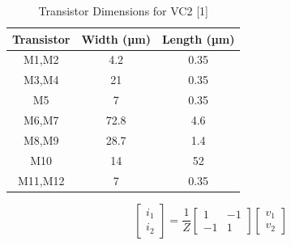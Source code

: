 \documentclass{./styles/svproc}
\begin{document}
\begin{table}[h]
\centering
\caption{Transistor Dimensions for VC2 [1]}
\begin{tabular}{|c|c|c|}
\hline
Transistor & Width (µm) & Length (µm) \\
\hline
M1,M2 & 4.2 & 0.35 \\
M3,M4 & 21 & 0.35 \\
M5 & 7 & 0.35 \\
M6,M7 & 72.8 & 4.6 \\
M8,M9 & 28.7 & 1.4 \\
M10 & 14 & 52 \\
M11,M12 & 7 & 0.35 \\
\hline
\end{tabular}
\end{table}
\vspace{0.5cm}

\begin{equation}\label{assumption_matrix}
\hspace{0cm}
\begin{bmatrix}
i_1\\
i_2 
\end{bmatrix} =\frac{1}{Z} \begin{bmatrix}
1&-1\\
-1&1
\end{bmatrix} \begin{bmatrix}
v_1\\
v_2 
\end{bmatrix}   
\end{equation}
\vspace{0.25cm}
\end{document}
